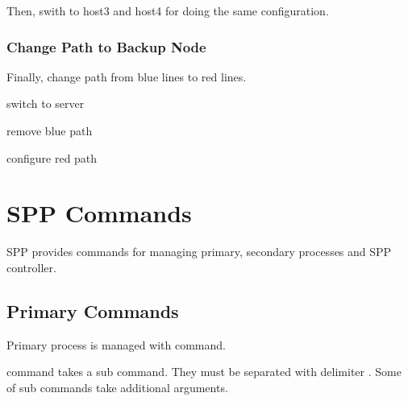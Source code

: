 \documentclass[a4paper,11pt,openany,oneside,english]{sphinxmanual}
\begin{document}
Then, swith to host3 and host4 for doing the same configuration.


\subsection{Change Path to Backup Node}
\label{\detokenize{usecases/multi_nodes:change-path-to-backup-node}}
Finally, change path from blue lines to red lines.

\begin{sphinxVerbatim}[commandchars=\\\{\},formatcom=\footnotesize]
 switch to server 

 remove blue path

 configure red path
\end{sphinxVerbatim}


\chapter{SPP Commands}
\label{\detokenize{commands/index:spp-commands}}\label{\detokenize{commands/index:spp-commands-index}}\label{\detokenize{commands/index::doc}}
SPP provides commands for managing primary, secondary processes and SPP
controller.


\section{Primary Commands}
\label{\detokenize{commands/primary:primary-commands}}\label{\detokenize{commands/primary:commands-primary}}\label{\detokenize{commands/primary::doc}}
Primary process is managed with  command.

 command takes a sub command. They must be separated with delimiter
\sphinxcode{\sphinxupquote{;}}. Some of sub commands take additional arguments.

\begin{sphinxVerbatim}[commandchars=\\\{\},formatcom=\footnotesize]
\end{sphinxVerbatim}
\end{document}
